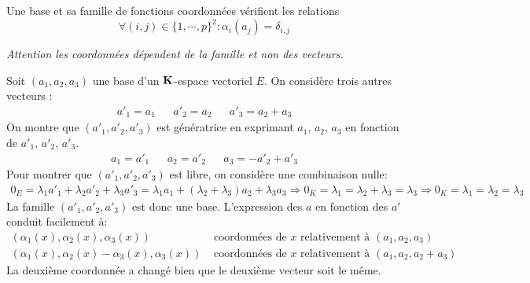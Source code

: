 \begin{rem}
  Une base et sa famille de fonctions coordonnées vérifient les relations 
\begin{displaymath}
 \forall (i,j)\in\{1,\cdots,p\}^2 : \alpha_i(a_j) = \delta_{i,j}
\end{displaymath}
\end{rem}


\emph{Attention les coordonnées dépendent de la famille et non des vecteurs.}
\begin{exple} Soit $(a_1,a_2,a_3)$ une base d'un $\mathbf{K}$-espace vectoriel $E$. On considère trois autres vecteurs :
\begin{align*}
 a'_1 = a_1 & & a'_2 = a_2 & & a'_3 = a_2+a_3
\end{align*}
On montre que $(a'_1,a'_2,a'_3)$ est génératrice en exprimant $a_1$, $a_2$, $a_3$ en fonction de $a'_1$, $a'_2$, $a'_3$.
\begin{align*}
 a_1 = a'_1 & & a_2 = a'_2 & & a_3 = -a'_2 + a'_3
\end{align*}
Pour montrer que $(a'_1,a'_2,a'_3)$ est libre, on considère une combinaison nulle:
\begin{multline*}
 0_E = \lambda_1a'_1+\lambda_2a'_2+\lambda_3a'_3 = \lambda_1a_1+(\lambda_2+\lambda_3)a_2+\lambda_3a_3
\Rightarrow 0_K =\lambda_1 = \lambda_2+\lambda_3=\lambda_3  
\Rightarrow 0_K =\lambda_1 = \lambda_2=\lambda_3 
\end{multline*}
La famille $(a'_1,a'_2,a'_3)$ est donc une base. L'expression des $a$ en fonction des $a'$ conduit facilement à:
\begin{align*}
 (\alpha_1(x),\alpha_2(x),\alpha_3(x)) &\text{ coordonnées de } x \text{ relativement à } (a_1,a_2,a_3) \\
(\alpha_1(x),\alpha_2(x)-\alpha_3(x),\alpha_3(x)) &\text{ coordonnées de } x \text{ relativement à } (a_1,a_2,a_2+a_3)
\end{align*}
La deuxième coordonnée a changé bien que le deuxième vecteur soit le même.
\end{exple}

